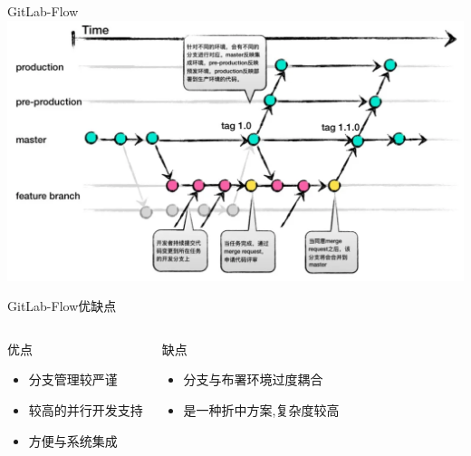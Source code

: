 \begin{frame}{GitLab-Flow}
    \centering
    \includegraphics[height=30ex,width=48ex]{figures/gitlab-flow.png}
\end{frame}

\begin{frame}[t]{GitLab-Flow}{优缺点}
    \begin{columns}[onlytextwidth]
        \begin{alertblock}{优点}
            \begin{itemize}
                \item 分支管理较严谨
                \item 较高的并行开发支持
                \item 方便与系统集成
            \end{itemize}
        \end{alertblock}
        \begin{exampleblock}{缺点}
            \begin{itemize}
                \item 分支与布署环境过度耦合
                \item 是一种折中方案,复杂度较高
            \end{itemize}
        \end{exampleblock}
    \end{columns}
\end{frame}